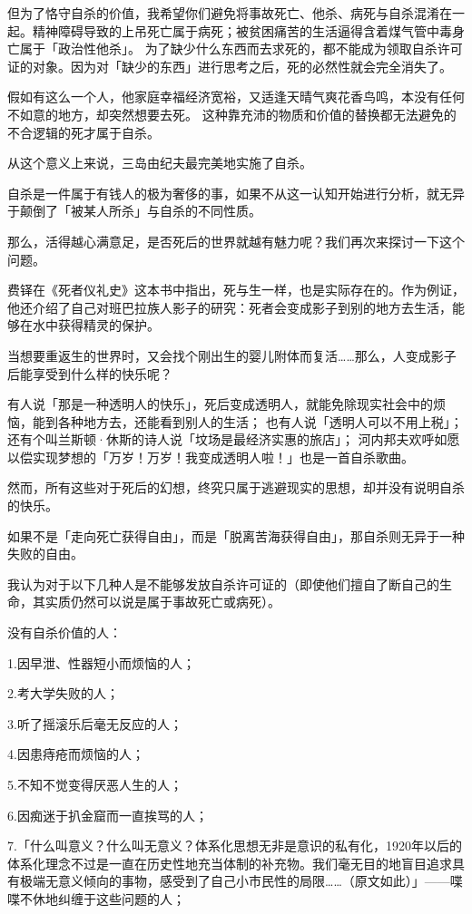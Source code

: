 \documentclass[UTF8]{ctexart}
\begin{document}
但为了恪守自杀的价值，我希望你们避免将事故死亡、他杀、病死与自杀混淆在一起。精神障碍导致的上吊死亡属于病死；被贫困痛苦的生活逼得含着煤气管中毒身亡属于「政治性他杀」。
为了缺少什么东西而去求死的，都不能成为领取自杀许可证的对象。因为对「缺少的东西」进行思考之后，死的必然性就会完全消失了。

假如有这么一个人，他家庭幸福经济宽裕，又适逢天晴气爽花香鸟鸣，本没有任何不如意的地方，却突然想要去死。
这种靠充沛的物质和价值的替换都无法避免的不合逻辑的死才属于自杀。

从这个意义上来说，三岛由纪夫最完美地实施了自杀。

自杀是一件属于有钱人的极为奢侈的事，如果不从这一认知开始进行分析，就无异于颠倒了「被某人所杀」与自杀的不同性质。

那么，活得越心满意足，是否死后的世界就越有魅力呢？我们再次来探讨一下这个问题。

费铎在《死者仪礼史》这本书中指出，死与生一样，也是实际存在的。作为例证，他还介绍了自己对班巴拉族人影子的研究：死者会变成影子到别的地方去生活，能够在水中获得精灵的保护。

当想要重返生的世界时，又会找个刚出生的婴儿附体而复活……那么，人变成影子后能享受到什么样的快乐呢？

有人说「那是一种透明人的快乐」，死后变成透明人，就能免除现实社会中的烦恼，能到各种地方去，还能看到别人的生活；
也有人说「透明人可以不用上税」；
还有个叫兰斯顿·休斯的诗人说「坟场是最经济实惠的旅店」；
河内邦夫欢呼如愿以偿实现梦想的「万岁！万岁！我变成透明人啦！」也是一首自杀歌曲。

然而，所有这些对于死后的幻想，终究只属于逃避现实的思想，却并没有说明自杀的快乐。

如果不是「走向死亡获得自由」，而是「脱离苦海获得自由」，那自杀则无异于一种失败的自由。

我认为对于以下几种人是不能够发放自杀许可证的（即使他们擅自了断自己的生命，其实质仍然可以说是属于事故死亡或病死）。

没有自杀价值的人：

1.因早泄、性器短小而烦恼的人；

2.考大学失败的人；

3.听了摇滚乐后毫无反应的人；

4.因患痔疮而烦恼的人；

5.不知不觉变得厌恶人生的人；

6.因痴迷于扒金窟而一直挨骂的人；

7.「什么叫意义？什么叫无意义？体系化思想无非是意识的私有化，1920年以后的体系化理念不过是一直在历史性地充当体制的补充物。我们毫无目的地盲目追求具有极端无意义倾向的事物，感受到了自己小市民性的局限……（原文如此）」——喋喋不休地纠缠于这些问题的人；
\end{document}
